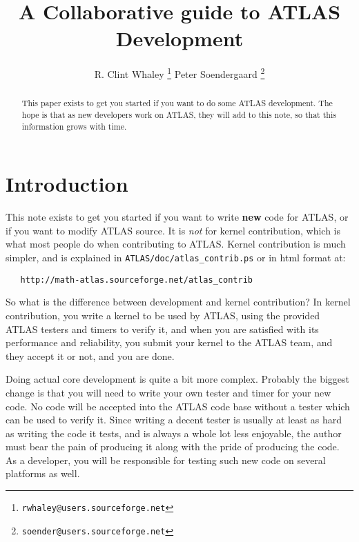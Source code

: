 \documentclass[11pt]{article}
\begin{document}
\begin{titlepage}
\title{A Collaborative guide to ATLAS Development}
\vspace{.4in}
\author
{
 R. Clint Whaley \thanks { {\tt rwhaley@users.sourceforge.net} }
 Peter Soendergaard \thanks { {\tt soender@users.sourceforge.net} }
}
\end{titlepage}
\maketitle
\begin{abstract}
This paper exists to get you started if you want to do some ATLAS development.
The hope is that as new developers work on ATLAS, they will add to this note,
so that this information grows with time.
\end{abstract}

\newpage
\tableofcontents

\newpage
\section{Introduction}
This note exists to get you started if you want to write {\bf new}
code for ATLAS, or if you want to modify ATLAS source.  It is {\em not}
for kernel contribution, which is what most people do when contributing to
ATLAS.  Kernel contribution is much simpler, and is explained in
{\tt ATLAS/doc/atlas\_contrib.ps} or in html format at:
\begin{verbatim}
   http://math-atlas.sourceforge.net/atlas_contrib
\end{verbatim}

So what is the difference between development and kernel contribution?  
In kernel
contribution, you write a kernel to be used by ATLAS, using the provided
ATLAS testers and timers to verify it, and when you are satisfied with its
performance and reliability, you submit your kernel to the ATLAS team,
and they accept it or not, and you are done.

Doing actual core development is quite a bit more complex.  Probably the
biggest change is that you will need to write your own tester and timer
for your new code.  No code will be accepted into the ATLAS code base without
a tester which can be used to verify it.  Since writing a decent tester is
usually at least as hard as writing the code it tests, and is always a
whole lot less enjoyable, the author must bear the pain of producing it
along with the pride of producing the code.  As a developer, you will be
responsible for testing such new code on several platforms as well.
\end{document}
